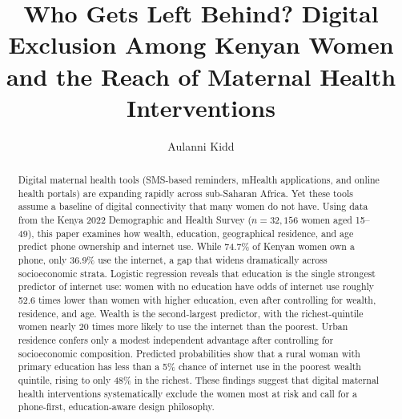 \documentclass[9pt,twoside]{pnas-new}
\begin{document}
\title{Who Gets Left Behind? Digital Exclusion Among Kenyan Women and
the Reach of Maternal Health Interventions}

\author[a]{Aulanni Kidd}






\equalauthors{}



\begin{abstract}
Digital maternal health tools (SMS-based reminders, mHealth
applications, and online health portals) are expanding rapidly across
sub-Saharan Africa. Yet these tools assume a baseline of digital
connectivity that many women do not have. Using data from the Kenya 2022
Demographic and Health Survey ($n = 32{,}156$ women aged 15--49), this
paper examines how wealth, education, geographical residence, and age
predict phone ownership and internet use. While 74.7\% of Kenyan women
own a phone, only 36.9\% use the internet, a gap that widens
dramatically across socioeconomic strata. Logistic regression reveals
that education is the single strongest predictor of internet use: women
with no education have odds of internet use roughly 52.6 times lower than
women with higher education, even after controlling for wealth, residence,
and age. Wealth is the second-largest predictor, with the
richest-quintile women nearly 20 times more likely to use the internet
than the poorest. Urban residence confers only a modest independent
advantage after controlling for socioeconomic composition. Predicted
probabilities show that a rural woman with primary education has less than
a 5\% chance of internet use in the poorest wealth quintile, rising to
only 48\% in the richest. These findings suggest that digital maternal
health interventions systematically exclude the women most at risk and
call for a phone-first, education-aware design philosophy.
\end{abstract}
\end{document}
